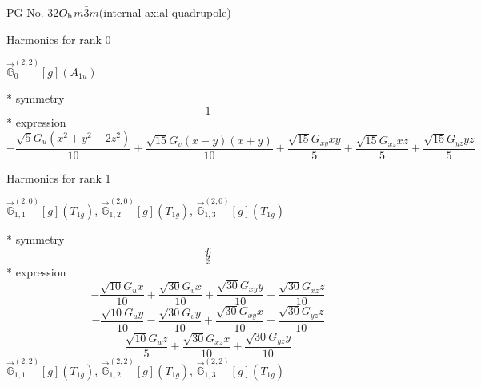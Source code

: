 \documentclass[fleqn,8pt]{jsarticle}
\begin{document}
\setcounter{MaxMatrixCols}{32}

\renewcommand{\tablename}{Table~}
\renewcommand{\figurename}{Figure~}
\begin{center}
\LARGE
PG No. 32\quad$O_{\rm h}$\quad$m\bar{3}m$\quad[ cubic ] (internal axial quadrupole)
\end{center}

\noindent * Harmonics for rank 0

\noindent\quad $\vec{\mathbb{G}}_{0}^{(2,2)}[g](A_{1u})$

\noindent\quad ** symmetry
\begin{dmath*}
1
\end{dmath*}
\noindent\quad ** expression
\begin{dmath*}
- \frac{\sqrt{5} G_{u} \left(x^{2} + y^{2} - 2 z^{2}\right)}{10} + \frac{\sqrt{15} G_{v} \left(x - y\right) \left(x + y\right)}{10} + \frac{\sqrt{15} G_{xy} x y}{5} + \frac{\sqrt{15} G_{xz} x z}{5} + \frac{\sqrt{15} G_{yz} y z}{5}
\end{dmath*}

\noindent * Harmonics for rank 1

\noindent\quad $\vec{\mathbb{G}}_{1,1}^{(2,0)}[g](T_{1g})$, $\vec{\mathbb{G}}_{1,2}^{(2,0)}[g](T_{1g})$, $\vec{\mathbb{G}}_{1,3}^{(2,0)}[g](T_{1g})$

\noindent\quad ** symmetry
\begin{dmath*}
x
\end{dmath*}
\begin{dmath*}
y
\end{dmath*}
\begin{dmath*}
z
\end{dmath*}
\noindent\quad ** expression
\begin{dmath*}
- \frac{\sqrt{10} G_{u} x}{10} + \frac{\sqrt{30} G_{v} x}{10} + \frac{\sqrt{30} G_{xy} y}{10} + \frac{\sqrt{30} G_{xz} z}{10}
\end{dmath*}
\begin{dmath*}
- \frac{\sqrt{10} G_{u} y}{10} - \frac{\sqrt{30} G_{v} y}{10} + \frac{\sqrt{30} G_{xy} x}{10} + \frac{\sqrt{30} G_{yz} z}{10}
\end{dmath*}
\begin{dmath*}
\frac{\sqrt{10} G_{u} z}{5} + \frac{\sqrt{30} G_{xz} x}{10} + \frac{\sqrt{30} G_{yz} y}{10}
\end{dmath*}
\noindent\quad $\vec{\mathbb{G}}_{1,1}^{(2,2)}[g](T_{1g})$, $\vec{\mathbb{G}}_{1,2}^{(2,2)}[g](T_{1g})$, $\vec{\mathbb{G}}_{1,3}^{(2,2)}[g](T_{1g})$
\end{document}
